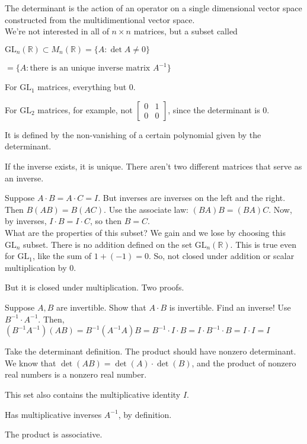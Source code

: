 \documentclass[12pt]{article}
\newcommand{\RR}{\mathbb{R}}
\newcommand{\GL}{\text{GL}}
\newcommand{\inv}[1]{#1^{-1}}
\theoremstyle{definition}
\begin{document}
The determinant is the action of an operator on a single dimensional vector space constructed
from the multidimentional vector space.
\\

We're not interested in all of \(n \times n\) matrices, but a subset called

\(\GL_n(\RR)\subset M_n(\RR) = \{A: \det A\neq 0\} \)

\(= \{A: \text{there is an unique inverse matrix }\inv{A}\} \)

For \(\GL_1\) matrices, everything but 0.

For \(\GL_2\) matrices, for example, not \(\left[\begin{smallmatrix}
    0 & 1\\
    0 & 0
\end{smallmatrix}\right]\), since the determinant is 0.

It is defined by the non-vanishing of a certain polynomial given by the determinant.

If the inverse exists, it is unique. There aren't two different matrices that serve as an inverse.

Suppose \(A\cdot B = A\cdot C = I\). But inverses are inverses on the left and the right.
Then \(B(AB) = B(AC)\). Use the associate law: \((BA)B = (BA)C\). Now, by inverses,
\(I\cdot B = I\cdot C\), so then \(B = C\).
\\

What are the properties of this subset? We gain and we lose by choosing this \(\GL_n\) subset.
There is no addition defined on the set \(\GL_n(\RR)\).
This is true even for \(\GL_1\), like the sum of \(1 + (-1) = 0\).
So, not closed under addition or scalar multiplication by 0.

But it is closed under multiplication. Two proofs.

Suppose \(A, B\) are invertible. Show that \(A\cdot B\) is invertible. Find an inverse!
Use \(\inv{B}\cdot\inv{A}\). Then, \((\inv{B}\inv{A})(AB)=\inv{B}(\inv{A}A)B=\inv{B}\cdot I\cdot B=I\cdot\inv{B}\cdot B=I\cdot I=I\)

Take the determinant definition. The product should have nonzero determinant. We know that
\(\det(AB) = \det(A)\cdot\det(B)\), and the product of nonzero real numbers is a nonzero real number.

This set also contains the multiplicative identity \(I\).

Has multiplicative inverses \(\inv{A}\), by definition.

The product is associative.
\end{document}
